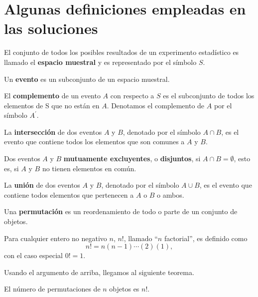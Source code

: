\section*{Algunas definiciones empleadas en las soluciones}
\begin{definition}
El conjunto de todos los posibles resultados de un experimento estadístico es llamado el \textbf{espacio muestral} y es representado por el símbolo $S$.
\end{definition}

\begin{definition}[Evento]
Un \textbf{evento} es un subconjunto de un espacio muestral.
\end{definition}

\begin{definition}[]
El \textbf{complemento} de un evento $A$ con respecto a $S$ es el subconjunto de todos los elementos de S que no están en $A$. Denotamos el complemento de $A$ por el símbolo $A^{\prime}$.
\end{definition}

\begin{definition}[]
La \textbf{intersección} de dos eventos $A$ y $B$, denotado por el símbolo $A\cap B$, es el evento que contiene todos los elementos que son comunes a $A$ y $B$.
\end{definition}

\begin{definition}[]
Dos eventos $A$ y $B$ \textbf{mutuamente excluyentes}, o \textbf{disjuntos}, si $A\cap B=\emptyset$, esto es, si $A$ y $B$ no tienen elementos en común.
\end{definition}

\begin{definition}[]
La \textbf{unión} de dos eventos $A$ y $B$, denotado por el símbolo $A\cup B$, es el evento que contiene todos elementos que pertenecen a $A$ o $B$ o ambos.
\end{definition}

\begin{definition}[]
Una \textbf{permutación} es un reordenamiento de todo o parte de un conjunto de objetos.
\end{definition}

\begin{definition}[]
Para cualquier entero no negativo $n$, $n!$, llamado ``$n$ factorial'', es definido como
\begin{equation*}
n!=n\left(n-1\right)\cdots\left(2\right)\left(1\right),
\end{equation*}
con el caso especial $0!=1$.
\end{definition}
Usando el argumento de arriba, llegamos al siguiente teorema.
\begin{theorem}
El número de permutaciones de $n$ objetos es $n!$.
\end{theorem}

